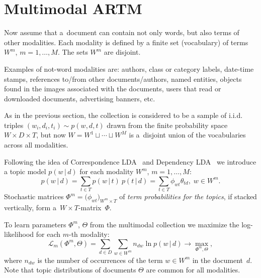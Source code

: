 \documentclass{sig-alternate-2013}
\newcommand{\cond}{\mspace{3mu}{|}\mspace{3mu}}
\newcommand{\cL}{\mathscr{L}}
\begin{document}
\section{Multimodal ARTM}
\label{sec:Multimodal}
Now assume that
a~document can contain not only words, but also terms of other modalities.
Each modality is defined by a finite set (vocabulary) of terms $W^m$, ${m=1,\dots,M}$.
The sets $W^m$ are disjoint.

Examples of not-word modalities are:
authors,
class or category labels,
date-time stamps,
references to/from other documents/authors,
named entities,
objects found in the images associated with the documents,
users that read or downloaded documents,
advertising banners,
etc.

As in the previous section,
the collection is considered to be a sample of i.i.d. triples
$(w_i,d_i,t_i) \sim p(w,d,t)$
drawn from the finite probability space $W\times D \times T$,
but now ${W=W^1\sqcup\cdots\sqcup W^M}$
is a~disjoint union of the vocabularies across all modalities.

Following the idea of Correspondence LDA~\cite{blei03modeling}
and Dependency LDA~\cite{rubin12statistical}
we introduce a topic model $p(w\cond d)$
for each modality $W^m$,\; $m=1,\dots,M$:
\[
    p(w\cond d)
    = \sum_{t\in T} p(w\cond t)\: p(t\cond d)
    = \sum_{t\in T} \phi_{wt} \theta_{td},\;
    w\in W^m.
\]
Stochastic matrices ${\Phi^m = \bigl( \phi_{wt} \bigr)_{W^m\times T}}$
of \emph{term probabilities for the topics},
if stacked vertically, form a~${W\!\!\times\!T}$-matrix~$\Phi$.

To learn parameters $\Phi^m$, $\Theta$ from the multimodal collection
we maximize the log-likelihood for each $m$-th modality:
\[
    \cL_m (\Phi^m,\Theta) =
    \sum_{d\in D}\sum_{w\in W^m} n_{dw} \ln p(w\cond d)
    \to \max_{\Phi^m,\Theta},
\]
where
$n_{dw}$ is the number of occurrences of the term ${w\in W^m}$ in the document~$d$.
Note that topic distributions of documents $\Theta$ are common for all modalities.
\end{document}
